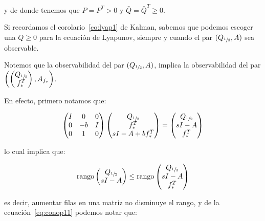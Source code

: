         y de donde tenemos que $P = P^T > 0$ y $\bar{Q} = \bar{Q}^T \ge 0$.

        Si recordamos el corolario~\ref{co:lyap1} de Kalman, sabemos que podemos escoger una $Q \ge 0$ para la ecuación de Lyapunov, siempre y cuando el par $(Q_{\sfrac{1}{2}}, A)$ sea observable.

        Notemos que la observabilidad del par $(Q_{\sfrac{1}{2}}, A)$, implica la observabilidad del par $\left( \begin{pmatrix} Q_{\sfrac{1}{2}} \\ f_*^T \end{pmatrix} , A_{f_*} \right)$.

        En efecto, primero notamos que:

        \begin{equation}
            \begin{pmatrix}
                I & 0 & 0 \\
                0 & -b & I \\
                0 & 1 & 0
            \end{pmatrix}
            \begin{pmatrix}
                Q_{\sfrac{1}{2}} \\
                f_*^T \\
                sI - A + b f_*^T
            \end{pmatrix} =
            \begin{pmatrix}
                Q_{\sfrac{1}{2}} \\
                sI - A \\
                f_*^T
            \end{pmatrix}
        \end{equation}

        lo cual implica que:

        \begin{equation*}
            \operatorname{rango}{\begin{pmatrix} Q_{\sfrac{1}{2}} \\ sI - A \end{pmatrix}} \le \operatorname{rango}{\begin{pmatrix} Q_{\sfrac{1}{2}} \\ sI - A \\ f_*^T \end{pmatrix}}
        \end{equation*}

        es decir, aumentar filas en una matriz no disminuye el rango, y de la ecuación~\ref{eq:conop11} podemos notar que:

